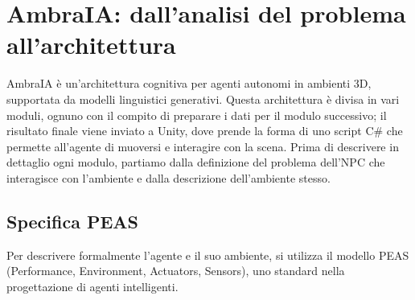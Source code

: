 \chapter{AmbraIA: dall'analisi del problema all'architettura}
\label{cap:architettura}

AmbraIA è un'architettura cognitiva per agenti autonomi in ambienti 3D, supportata da modelli linguistici generativi. Questa architettura è divisa in vari moduli, ognuno con il compito di preparare i dati per il modulo successivo; il risultato finale viene inviato a Unity, dove prende la forma di uno script C\# che permette all'agente di muoversi e interagire con la scena. Prima di descrivere in dettaglio ogni modulo, partiamo dalla definizione del problema dell'NPC che interagisce con l'ambiente e dalla descrizione dell'ambiente stesso.

\section{Specifica PEAS}

Per descrivere formalmente l'agente e il suo ambiente, si utilizza il modello PEAS (Performance, Environment, Actuators, Sensors), uno standard nella progettazione di agenti intelligenti.

